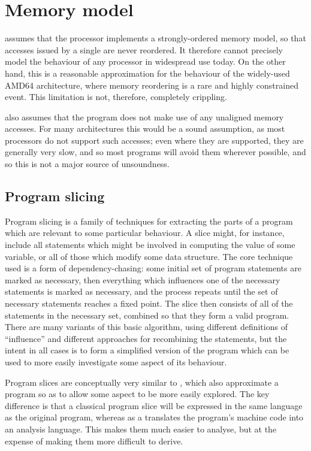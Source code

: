 \section{Memory model}

{\Technique} assumes that the processor implements a strongly-ordered
memory model, so that accesses issued by a single are never reordered.
It therefore cannot precisely model the behaviour of any processor in
widespread use today.  On the other hand, this is a reasonable
approximation for the behaviour of the widely-used AMD64
architecture\needCite{}, where memory reordering is a rare and highly
constrained event.  This limitation is not, therefore, completely
crippling.

{\Technique} also assumes that the program does not make use of any
unaligned memory accesses.  For many architectures this would be a
sound assumption, as most processors do not support such accesses;
even where they are supported, they are generally very slow, and so
most programs will avoid them wherever possible, and so this is not a
major source of unsoundness.

\subsection{Program slicing}

Program slicing is a family of techniques
for extracting the parts of a program which are relevant to some
particular behaviour.  A slice might, for instance, include all
statements which might be involved in computing the value of some
variable, or all of those which modify some data structure.  The core
technique used is a form of dependency-chasing: some initial set of
program statements are marked as necessary, then everything which
influences one of the necessary statements is marked as necessary, and
the process repeats until the set of necessary statements reaches a
fixed point.  The slice then consists of all of the statements in the
necessary set, combined so that they form a valid program.  There are
many variants of this basic algorithm, using different definitions of
``influence'' and different approaches for recombining the statements,
but the intent in all cases is to form a simplified version of the
program which can be used to more easily investigate some aspect of
its behaviour.

Program slices are conceptually very similar to {\StateMachines},
which also approximate a program so as to allow some aspect to be more
easily explored.  The key difference is that a classical program slice
will be expressed in the same language as the original program,
whereas as a {\StateMachine} translates the program's machine code
into an analysis language.  This makes them much easier to analyse,
but at the expense of making them more difficult to derive.

